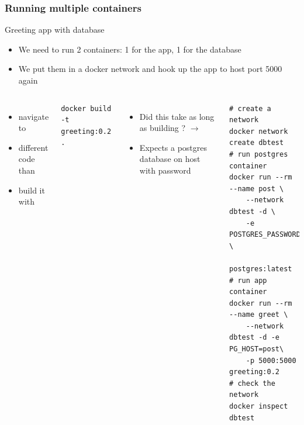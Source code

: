 \begin{frame}[fragile]
	\frametitle{Running multiple containers}
	\begin{block}{Greeting app with database}%
		\begin{itemize}
			\item We need to run 2 containers: 1 for the app, 1 for the database
			\item We put them in a docker network  and hook up the app to host port 5000 again
		\end{itemize}
	\end{block}
	
	\vspace{-.25cm}\begin{columns}
		\begin{itemize}
			\item navigate to 
			\item different code than 
			\item build it with
		\end{itemize}
		\begin{lstlisting}
docker build -t greeting:0.2 .
		\end{lstlisting}
		\begin{itemize}
			\item Did this take as long as building ? $\rightarrow$ 
			\item Expects a postgres database on host  with password 
		\end{itemize}
		
		
		\begin{lstlisting}
# create a network
docker network create dbtest
# run postgres container
docker run --rm --name post \
	--network dbtest -d \
	-e POSTGRES_PASSWORD=holymoly \
	postgres:latest
# run app container
docker run --rm --name greet \
	--network dbtest -d -e PG_HOST=post\
	-p 5000:5000 greeting:0.2
# check the network
docker inspect dbtest
		\end{lstlisting}

	\end{columns}	
\end{frame}

